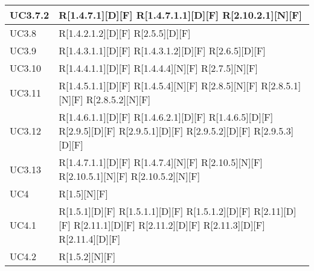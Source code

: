 \begin{longtable}{X | X}
\hline
UC3.7.2 & R[1.4.7.1][D][F] \newline
R[1.4.7.1.1][D][F] \newline
R[2.10.2.1][N][F]  \\
\hline
UC3.8 & R[1.4.2.1.2][D][F] \newline
R[2.5.5][D][F]  \\
\hline
UC3.9 & R[1.4.3.1.1][D][F] \newline
R[1.4.3.1.2][D][F] \newline
R[2.6.5][D][F]  \\
\hline
UC3.10 & R[1.4.4.1.1][D][F] \newline
R[1.4.4.4][N][F] \newline
R[2.7.5][N][F]  \\
\hline
UC3.11 & R[1.4.5.1.1][D][F] \newline
R[1.4.5.4][N][F] \newline
R[2.8.5][N][F] \newline
R[2.8.5.1][N][F] \newline
R[2.8.5.2][N][F]  \\
\hline
UC3.12 & R[1.4.6.1.1][D][F] \newline
R[1.4.6.2.1][D][F] \newline
R[1.4.6.5][D][F] \newline
R[2.9.5][D][F] \newline
R[2.9.5.1][D][F] \newline
R[2.9.5.2][D][F] \newline
R[2.9.5.3][D][F]  \\
\hline
UC3.13 & R[1.4.7.1.1][D][F] \newline
R[1.4.7.4][N][F] \newline
R[2.10.5][N][F] \newline
R[2.10.5.1][N][F] \newline
R[2.10.5.2][N][F]  \\
\hline
UC4 & R[1.5][N][F]  \\
\hline
UC4.1 & R[1.5.1][D][F] \newline
R[1.5.1.1][D][F] \newline
R[1.5.1.2][D][F] \newline
R[2.11][D][F] \newline
R[2.11.1][D][F] \newline
R[2.11.2][D][F] \newline
R[2.11.3][D][F] \newline
R[2.11.4][D][F]  \\
\hline
UC4.2 & R[1.5.2][N][F] \newline

\end{longtable}
